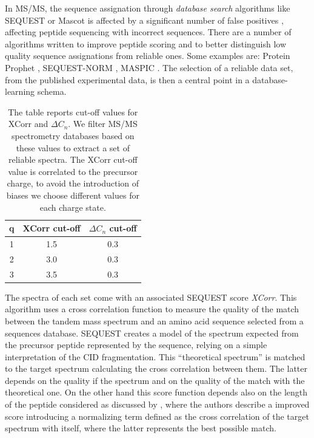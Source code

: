 In MS/MS, the sequence assignation through \emph{database search} algorithms like
SEQUEST or Mascot is affected by a significant number of false positives
\cite{keller2002experimental}, affecting peptide sequencing with incorrect
sequences.
There are a number of algorithms written to improve peptide scoring and to
better distinguish low quality sequence assignations from reliable ones. 
Some examples are: Protein
Prophet \cite{proteinprophet2002,aebersold2003statistical}, SEQUEST-NORM
\cite{yates-analchem-2002}, MASPIC \cite{narasimhan2005maspic}.
The selection of a reliable data set, from the published experimental data, is
then a central point in a database-learning schema.

\begin{table}[!thb]
\centering
\begin{tabular}{ccc}
\hline
\hline
q & XCorr cut-off & $\Delta C_n$ cut-off\\
\hline
1 & 1.5	& 0.3\\
2 & 3.0	& 0.3\\
3 & 3.5	& 0.3\\
\hline
\hline
\end{tabular}
\caption{\label{tab:xcorr-cutoff}The table reports cut-off values for XCorr and
$\Delta C_n$.
We filter MS/MS spectrometry databases based on these values to extract a set of
reliable spectra.
The XCorr cut-off value is correlated to the precursor charge, to avoid the
introduction of biases we choose different values for each charge state.}
\end{table}

The spectra of each set come with an associated SEQUEST score \emph{XCorr}.
This algorithm uses a cross correlation function to measure the quality of the
match between the tandem mass spectrum and an amino acid sequence selected from
a sequences database.
SEQUEST creates a model of the spectrum expected from the precursor peptide
represented by the sequence, relying on a simple interpretation of the CID
fragmentation. This ``theoretical spectrum'' is matched to the target spectrum
calculating the cross correlation between them.
The latter depends on the quality if the spectrum and on the quality of the
match with the theoretical one\cite{eng1994}.
On the other hand this score function depends also on the length of the peptide
considered as discussed by \citet{yates-analchem-2002}, where the authors
describe a improved score introducing a normalizing term defined as the cross
correlation of the target spectrum with itself, where the latter represents the best possible
match.


